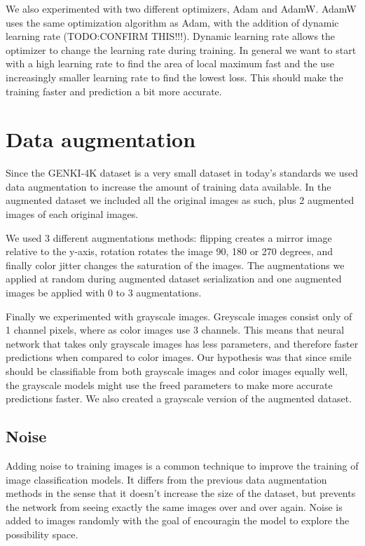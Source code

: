 \documentclass[12pt,a4paper,english
]{tunithesis}
\begin{document}
We also experimented with two different optimizers, Adam and AdamW.
AdamW uses the same optimization algorithm as Adam, with the addition of dynamic learning rate (TODO:CONFIRM THIS!!!). Dynamic learning rate allows the optimizer to change the learning rate during training. In general we want to start with a high learning rate to find the area of local maximum fast and the use increasingly smaller learning rate to find the lowest loss. This should make the training faster and prediction a bit more accurate.

\section{Data augmentation}
\label{sec:dataaug}
Since the GENKI-4K dataset is a very small dataset in today's standards we used data augmentation to increase the amount of training data available. In the augmented dataset we included all the original images as such, plus 2 augmented images of each original images.

We used 3 different augmentations methods: flipping creates a mirror image relative to the y-axis, rotation rotates the image 90, 180 or 270 degrees, and finally color jitter changes the saturation of the images. The augmentations we applied at random during augmented dataset serialization and one augmented images be applied with 0 to 3 augmentations.

Finally we experimented with grayscale images. Greyscale images consist only of 1 channel pixels, where as color images use 3 channels. This means that neural network that takes only grayscale images has less parameters, and therefore faster predictions when compared to color images. Our hypothesis was that since smile should be classifiable from both grayscale images and color images equally well, the grayscale models might use the freed parameters to make more accurate predictions faster. We also created a grayscale version of the augmented dataset.

\subsection{Noise}
Adding noise to training images is a common technique to improve the training of image classification models. It differs from the previous data augmentation methods in the sense that it doesn't increase the size of the dataset, but prevents the network from seeing exactly the same images over and over again. Noise is added to images randomly with the goal of encouragin the model to explore the possibility space.
\end{document}
